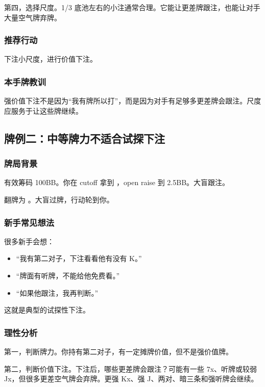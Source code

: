 第四，选择尺度。1/3 底池左右的小注通常合理。它能让更差牌跟注，也能让对手大量空气牌弃牌。

\subsubsection*{推荐行动}

下注小尺度，进行价值下注。

\subsubsection*{本手牌教训}

强价值下注不是因为“我有牌所以打”，而是因为对手有足够多更差牌会跟注。尺度应服务于让这些牌继续。

\subsection{牌例二：中等牌力不适合试探下注}

\subsubsection*{牌局背景}

有效筹码 100BB。你在 cutoff 拿到 ，open raise 到 2.5BB。大盲跟注。

翻牌为 。大盲过牌，行动轮到你。

\subsubsection*{新手常见想法}

很多新手会想：

\begin{itemize}
\item “我有第二对子，下注看看他有没有 K。”
\item “牌面有听牌，不能给他免费看。”
\item “如果他跟注，我再判断。”
\end{itemize}

这就是典型的试探性下注。

\subsubsection*{理性分析}

第一，判断牌力。你持有第二对子，有一定摊牌价值，但不是强价值牌。

第二，判断价值下注。下注后，哪些更差牌会跟注？可能有一些 7x、听牌或较弱 Jx，但很多更差空气牌会弃牌。更强 Kx、强 J、两对、暗三条和强听牌会继续。

